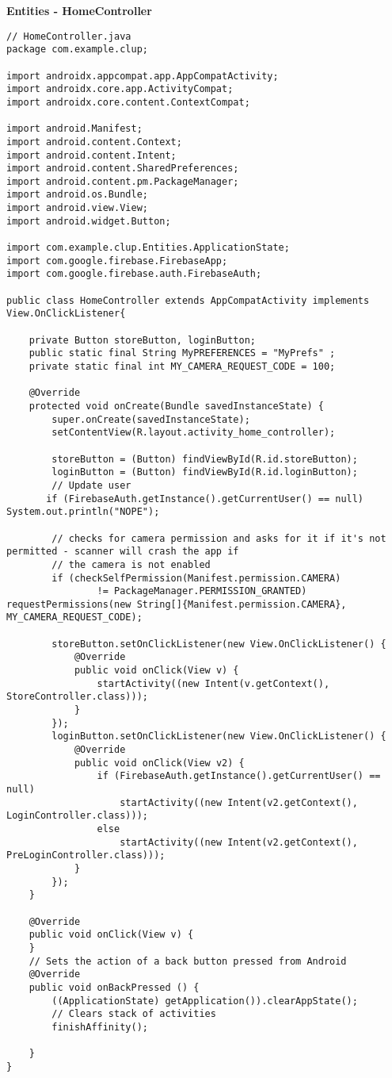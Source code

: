 \textbf{Entities - HomeController}

\begin{lstlisting}
// HomeController.java
package com.example.clup;

import androidx.appcompat.app.AppCompatActivity;
import androidx.core.app.ActivityCompat;
import androidx.core.content.ContextCompat;

import android.Manifest;
import android.content.Context;
import android.content.Intent;
import android.content.SharedPreferences;
import android.content.pm.PackageManager;
import android.os.Bundle;
import android.view.View;
import android.widget.Button;

import com.example.clup.Entities.ApplicationState;
import com.google.firebase.FirebaseApp;
import com.google.firebase.auth.FirebaseAuth;

public class HomeController extends AppCompatActivity implements View.OnClickListener{

    private Button storeButton, loginButton;
    public static final String MyPREFERENCES = "MyPrefs" ;
    private static final int MY_CAMERA_REQUEST_CODE = 100;

    @Override
    protected void onCreate(Bundle savedInstanceState) {
        super.onCreate(savedInstanceState);
        setContentView(R.layout.activity_home_controller);

        storeButton = (Button) findViewById(R.id.storeButton);
        loginButton = (Button) findViewById(R.id.loginButton);
        // Update user
       if (FirebaseAuth.getInstance().getCurrentUser() == null) System.out.println("NOPE");

        // checks for camera permission and asks for it if it's not permitted - scanner will crash the app if
        // the camera is not enabled
        if (checkSelfPermission(Manifest.permission.CAMERA)
                != PackageManager.PERMISSION_GRANTED) requestPermissions(new String[]{Manifest.permission.CAMERA}, MY_CAMERA_REQUEST_CODE);

        storeButton.setOnClickListener(new View.OnClickListener() {
            @Override
            public void onClick(View v) {
                startActivity((new Intent(v.getContext(), StoreController.class)));
            }
        });
        loginButton.setOnClickListener(new View.OnClickListener() {
            @Override
            public void onClick(View v2) {
                if (FirebaseAuth.getInstance().getCurrentUser() == null)
                    startActivity((new Intent(v2.getContext(), LoginController.class)));
                else
                    startActivity((new Intent(v2.getContext(), PreLoginController.class)));
            }
        });
    }

    @Override
    public void onClick(View v) {
    }
    // Sets the action of a back button pressed from Android
    @Override
    public void onBackPressed () {
        ((ApplicationState) getApplication()).clearAppState();
        // Clears stack of activities
        finishAffinity();

    }
}
\end{lstlisting}